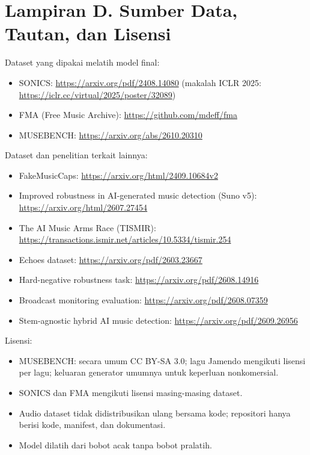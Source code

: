 \section*{Lampiran D. Sumber Data, Tautan, dan Lisensi}
Dataset yang dipakai melatih model final:
\begin{itemize}
\item SONICS: \url{https://arxiv.org/pdf/2408.14080} (makalah ICLR 2025: \url{https://iclr.cc/virtual/2025/poster/32089})
\item FMA (Free Music Archive): \url{https://github.com/mdeff/fma}
\item MUSEBENCH: \url{https://arxiv.org/abs/2610.20310}
\end{itemize}
Dataset dan penelitian terkait lainnya:
\begin{itemize}
\item FakeMusicCaps: \url{https://arxiv.org/html/2409.10684v2}
\item Improved robustness in AI-generated music detection (Suno v5): \url{https://arxiv.org/html/2607.27454}
\item The AI Music Arms Race (TISMIR): \url{https://transactions.ismir.net/articles/10.5334/tismir.254}
\item Echoes dataset: \url{https://arxiv.org/pdf/2603.23667}
\item Hard-negative robustness task: \url{https://arxiv.org/pdf/2608.14916}
\item Broadcast monitoring evaluation: \url{https://arxiv.org/pdf/2608.07359}
\item Stem-agnostic hybrid AI music detection: \url{https://arxiv.org/pdf/2609.26956}
\end{itemize}
Lisensi:
\begin{itemize}
\item MUSEBENCH: secara umum CC BY-SA 3.0; lagu Jamendo mengikuti lisensi per lagu; keluaran generator umumnya untuk keperluan nonkomersial.
\item SONICS dan FMA mengikuti lisensi masing-masing dataset.
\item Audio dataset tidak didistribusikan ulang bersama kode; repositori hanya berisi kode, manifest, dan dokumentasi.
\item Model dilatih dari bobot acak tanpa bobot pralatih.
\end{itemize}
